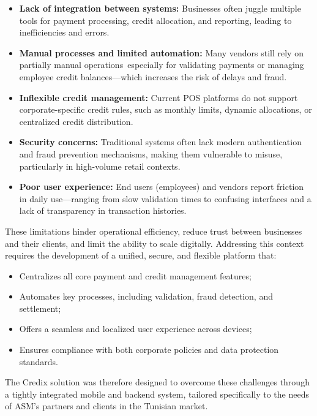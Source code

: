 \begin{itemize}
    \item \textbf{Lack of integration between systems:} Businesses often juggle multiple tools for payment processing, credit allocation, and reporting, leading to inefficiencies and errors.

    \item \textbf{Manual processes and limited automation:} Many vendors still rely on partially manual operations\hspace{0pt}\textemdash\ especially for validating payments or managing employee credit balances—which increases the risk of delays and fraud.
    
    \item \textbf{Inflexible credit management:} Current POS platforms do not support corporate-specific credit rules, such as monthly limits, dynamic allocations, or centralized credit distribution.
    
    \item \textbf{Security concerns:} Traditional systems often lack modern authentication and fraud prevention mechanisms, making them vulnerable to misuse, particularly in high-volume retail contexts.
    
    \item \textbf{Poor user experience:} End users (employees) and vendors report friction in daily use—ranging from slow validation times to confusing interfaces and a lack of transparency in transaction histories.
\end{itemize}

These limitations hinder operational efficiency, reduce trust between businesses and their clients, and limit the ability to scale digitally. Addressing this context requires the development of a unified, secure, and flexible platform that:

\begin{itemize}
    \item Centralizes all core payment and credit management features;
    \item Automates key processes, including validation, fraud detection, and settlement;
    \item Offers a seamless and localized user experience across devices;
    \item Ensures compliance with both corporate policies and data protection standards.
\end{itemize}

The Credix solution was therefore designed to overcome these challenges through a tightly integrated mobile and backend system, tailored specifically to the needs of ASM’s partners and clients in the Tunisian market.


